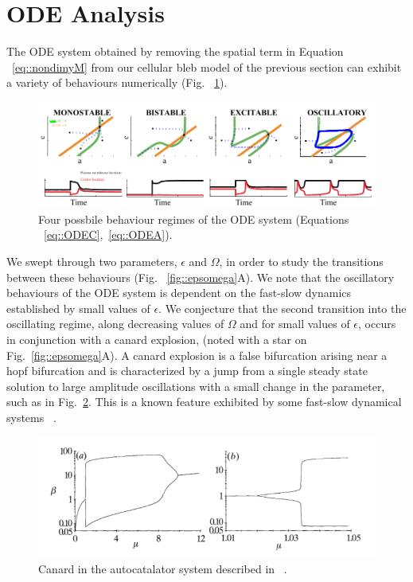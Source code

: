 \section{ODE Analysis}

The ODE system obtained by removing the spatial term in Equation ~\ref{eq::nondimyM} from our cellular bleb model of the previous section can exhibit a variety of behaviours numerically (Fig. ~\ref{fig::odeanal}). 
\begin{figure}[h]
\centering
\captionsetup{width=\linewidth}
\includegraphics[width=4.5in]{Project2/figs/ODE_Analysis.pdf}
\caption{Four possbile behaviour regimes of the ODE system (Equations ~\ref{eq::ODEC},~\ref{eq::ODEA}).}
\label{fig::odeanal}
\end{figure}

We swept through two parameters, $\epsilon$ and $\Omega$, in order to study the transitions between these behaviours (Fig. ~\ref{fig::epsomega}A). We note that the oscillatory behaviours of the ODE system is dependent on the fast-slow dynamics established by small values of $\epsilon$. We conjecture that the second transition into the oscillating regime, along decreasing values of $\Omega$ and for small values of $\epsilon$, occurs in conjunction with a canard explosion, (noted with a star on Fig.~\ref{fig::epsomega}A). A canard explosion is a false bifurcation arising near a hopf bifurcation and is characterized by a jump from a single steady state solution to large amplitude oscillations with a small change in the parameter, such as in Fig.~\ref{fig::canard}. This is a known feature exhibited by some fast-slow dynamical systems ~\cite{Peng1991}.

\begin{figure}[h]
\centering
\captionsetup{width=\linewidth}
\includegraphics[width=4.5in]{Project2/figs/canardfrompaper.pdf}
\caption{Canard in the autocatalator system described in ~\cite{Peng1991}.}
\label{fig::canard}
\end{figure}



